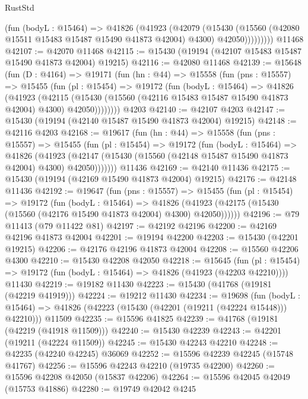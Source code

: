 \begin{lexlean}{RustStd}
\begin{coremodule}
              (fun (bodyL : @15464) =>
              @41826
                (@41923
                  (@42079
                    (@15430
                      (@15560 (@42080 @15511 @15483 @15487 @15490 @41873 @42004) @4300)
                      @42050)))))))))
    @11468
@42107 := @42070 @11468
@42115 := @15430 (@19194 (@42107 @15483 @15487 @15490 @41873 @42004) @19215)
@42116 := @42080 @11468
@42139 := @15648
    (fun (D : @4164) =>
    @19171
      (fun (hn : @44) =>
      @15558
        (fun (pns : @15557) =>
        @15455
          (fun (pl : @15454) =>
          @19172
            (fun (bodyL : @15464) =>
            @41826
              (@41923
                (@42115
                  (@15430 (@15560 (@42116 @15483 @15487 @15490 @41873 @42004) @4300) @42050))))))))
    @4203
@42140 := @42107 @4203
@42147 := @15430 (@19194 (@42140 @15487 @15490 @41873 @42004) @19215)
@42148 := @42116 @4203
@42168 := @19617
    (fun (hn : @44) =>
    @15558
      (fun (pns : @15557) =>
      @15455
        (fun (pl : @15454) =>
        @19172
          (fun (bodyL : @15464) =>
          @41826
            (@41923
              (@42147 (@15430 (@15560 (@42148 @15487 @15490 @41873 @42004) @4300) @42050)))))))
    @11436
@42169 := @42140 @11436
@42175 := @15430 (@19194 (@42169 @15490 @41873 @42004) @19215)
@42176 := @42148 @11436
@42192 := @19647
    (fun (pns : @15557) =>
    @15455
      (fun (pl : @15454) =>
      @19172
        (fun (bodyL : @15464) =>
        @41826 (@41923 (@42175 (@15430 (@15560 (@42176 @15490 @41873 @42004) @4300) @42050))))))
@42196 := @79 @11413 (@79 @11422 @81)
@42197 := @42192 @42196
@42200 := @42169 @42196 @41873 @42004
@42201 := @19194 @42200
@42203 := @15430 (@42201 @19215)
@42206 := @42176 @42196 @41873 @42004
@42208 := @15560 @42206 @4300
@42210 := @15430 @42208 @42050
@42218 := @15645
    (fun (pl : @15454) => @19172 (fun (bodyL : @15464) => @41826 (@41923 (@42203 @42210))))
    @11430
@42219 := @19182 @11430
@42223 := @15430 (@41768 (@19181 (@42219 @41919)))
@42224 := @19212 @11430
@42234 := @19698
    (fun (bodyL : @15464) => @41826 (@42223 (@15430 (@42201 (@19211 (@42224 @15448))) @42210)))
    @11509
@42235 := @15596 @41825
@42239 := @41768 (@19181 (@42219 (@41918 @11509)))
@42240 := @15430 @42239
@42243 := @42201 (@19211 (@42224 @11509))
@42245 := @15430 @42243 @42210
@42248 := @42235 (@42240 @42245) @36069
@42252 := @15596 @42239 @42245 (@15748 @41767)
@42256 := @15596 @42243 @42210 (@19735 @42200)
@42260 := @15596 @42208 @42050 (@15837 @42206)
@42264 := @15596 @42045 @42049 (@15753 @41886)
@42280 := @19749
    @42042
    @4245

\end{coremodule}
\end{lexlean}
